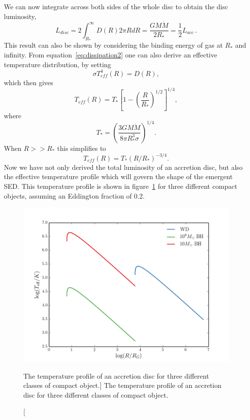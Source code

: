 We can now integrate across both sides of the whole disc to obtain the disc luminosity,
\begin{equation}
L_{disc} = 2 \int^\infty_{R_*} D(R) 2\pi R dR = \frac{G M \dot{M}}{2 R_*} = \frac{1}{2} L_{acc}\, .
\label{eq:ldisc}
\end{equation}
This result can also be shown by considering the binding energy of gas at $R_*$ and infinity.
From equation~\ref{eq:dissipation2} one can also derive an effective temperature distribution,
by setting
\begin{equation}
\sigma T_{eff}^4 (R) = D(R),
\end{equation}
which then gives
\begin{equation}
T_{eff} (R) = T_* \left[1 - \left( \frac{R}{R_*} \right)^{1/2} \right]^{1/4},
\label{disk_t_profile}
\end{equation}
where
\begin{equation}
T_* = \left ( \frac{3 G M \dot{M}}{8 \pi R_*^3 \sigma} \right)^{1/4}.
\end{equation}
When $R>>R_*$ this simplifies to
\begin{equation}
T_{eff} (R) = T_* (R / R_*)^{-3/4}.
\end{equation}
Now we have not only derived the total luminosity of an accretion disc, but
also the effective temperature profile which will govern the shape of the emergent SED.
This temperature profile is shown in figure~\ref{fig:disk_t}
for three different compact objects, assuming an Eddington fraction of 0.2.

\begin{figure}
\centering
\includegraphics[width=1.0\textwidth]{figures/01-intro/disk_t.png}
\caption
[The temperature profile of an accretion disc for three different classes
of compact object.]
{
The temperature profile of an accretion disc for three different classes
of compact object.
} 
\label{fig:disk_t}
\end{figure}


